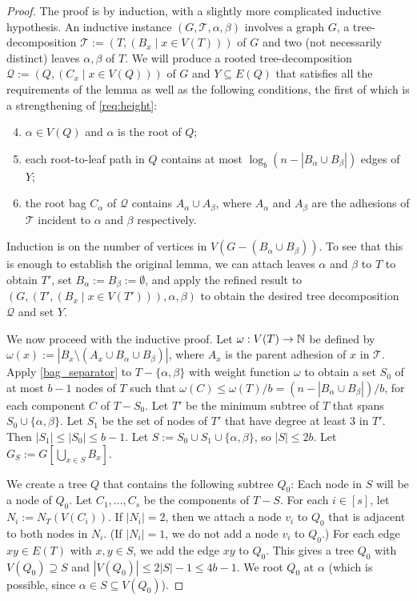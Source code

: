 \begin{proof}
  The proof is by induction, with a slightly more complicated inductive hypothesis. An inductive instance $(G,\mathcal{T}, \alpha, \beta)$ involves a graph $G$, a tree-decomposition $\mathcal{T}:=(T,(B_x\mid x\in V(T)))$ of $G$ and two (not necessarily distinct) leaves $\alpha,\beta$ of $T$.  We will produce a rooted tree-decomposition $\mathcal{Q}:=(Q,(C_x\mid x\in V(Q)))$ of $G$ and $Y\subseteq E(Q)$ that satisfies all the requirements of the lemma as well as the following conditions, the first of which is a strengthening of \ref{req:height}:
  \begin{enumerate}[nosep,nolistsep,label=\rm(\alph*)]\setcounter{enumi}{3}
    \item\label{req:root} $\alpha\in V(Q)$ and $\alpha$ is the root of $Q$;
    \item\label{req:height_prime} each root-to-leaf path in $Q$ contains at most $\log_b(n-|B_\alpha\cup B_\beta|)$ edges of $Y$;
    \item\label{req:adhesion_pairs} the root bag $C_\alpha$ of $\mathcal{Q}$ contains $A_\alpha\cup A_\beta$, where $A_\alpha$ and $A_\beta$ are the adhesions of $\mathcal{T}$ incident to $\alpha$ and $\beta$ respectively.
  \end{enumerate}
  Induction is on the number of vertices in $V(G-(B_\alpha\cup B_\beta))$.  To see that this is enough to establish the original lemma, we can attach leaves $\alpha$ and $\beta$ to $T$ to obtain $T'$, set $B_\alpha:=B_\beta:=\emptyset$, and apply the refined result to $(G,(T',(B_x\mid x\in V(T'))),\alpha,\beta)$ to obtain the desired tree decomposition $\mathcal{Q}$ and set $Y$.
   
  We now proceed with the inductive proof. Let $\omega: V(T)\to\mathbb{N}$ be defined by $\omega(x):=|B_x\setminus (A_x\cup B_\alpha\cup B_\beta)|$, where $A_x$ is the parent adhesion of $x$ in $\mathcal{T}$.  Apply \cref{bag_separator} to $T-\{\alpha,\beta\}$ with weight function $\omega$ to obtain a set $S_0$ of at most $b-1$ nodes of $T$ such that $\omega(C)\le\omega(T)/b=(n-|B_\alpha\cup B_\beta|)/b$, for each component $C$ of $T-S_0$.  Let $T'$ be the minimum subtree of $T$ that spans $S_0\cup\{\alpha,\beta\}$. Let $S_1$ be the set of nodes of $T'$ that have degree at least $3$ in $T'$.  Then $|S_1|\le |S_0|\le b-1$. Let $S:=S_0\cup S_1\cup\{\alpha,\beta\}$, so $|S|\le 2b$.  Let $G_S:=G[\bigcup_{x\in S}B_x]$.

  We create a tree $Q$ that contains the following subtree $Q_0$: Each node in $S$ will be a node of $Q_0$.  Let $C_1,\ldots,C_s$ be the components of $T-S$.  For each $i\in[s]$, let $N_i:=N_T(V(C_i))$. If $|N_i|=2$, then we attach a node $v_i$ to $Q_0$ that is adjacent to both nodes in $N_i$. (If $|N_i|=1$, we do not add a node $v_i$ to $Q_0$.)  For each edge $xy\in E(T)$ with $x,y\in S$, we add the edge $xy$ to $Q_0$. This gives a tree $Q_0$ with $V(Q_0)\supseteq S$ and $|V(Q_0)|\le 2|S|-1\le 4b-1$.  We root $Q_0$ at $\alpha$ (which is possible, since $\alpha\in S\subseteq V(Q_0)$).
  

\end{proof}
